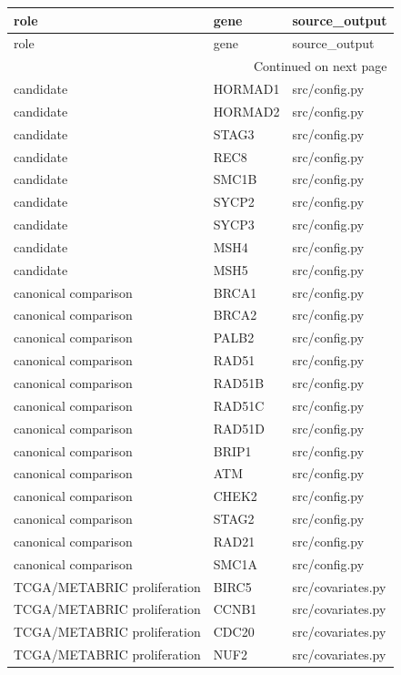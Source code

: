 \begin{longtable}{lll}
\toprule
role & gene & source\_output \\
\midrule
\endfirsthead
\toprule
role & gene & source\_output \\
\midrule
\endhead
\midrule
\multicolumn{3}{r}{Continued on next page} \\
\midrule
\endfoot
\bottomrule
\endlastfoot
candidate & HORMAD1 & src/config.py \\
candidate & HORMAD2 & src/config.py \\
candidate & STAG3 & src/config.py \\
candidate & REC8 & src/config.py \\
candidate & SMC1B & src/config.py \\
candidate & SYCP2 & src/config.py \\
candidate & SYCP3 & src/config.py \\
candidate & MSH4 & src/config.py \\
candidate & MSH5 & src/config.py \\
canonical comparison & BRCA1 & src/config.py \\
canonical comparison & BRCA2 & src/config.py \\
canonical comparison & PALB2 & src/config.py \\
canonical comparison & RAD51 & src/config.py \\
canonical comparison & RAD51B & src/config.py \\
canonical comparison & RAD51C & src/config.py \\
canonical comparison & RAD51D & src/config.py \\
canonical comparison & BRIP1 & src/config.py \\
canonical comparison & ATM & src/config.py \\
canonical comparison & CHEK2 & src/config.py \\
canonical comparison & STAG2 & src/config.py \\
canonical comparison & RAD21 & src/config.py \\
canonical comparison & SMC1A & src/config.py \\
TCGA/METABRIC proliferation & BIRC5 & src/covariates.py \\
TCGA/METABRIC proliferation & CCNB1 & src/covariates.py \\
TCGA/METABRIC proliferation & CDC20 & src/covariates.py \\
TCGA/METABRIC proliferation & NUF2 & src/covariates.py \\

\end{longtable}
